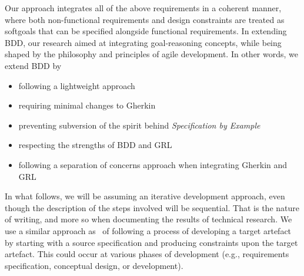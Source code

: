 \documentclass[dissertation,final]{softeng}
\begin{document}
\begin{table}[h!]
\caption[Three types of Requirements]{Three types of requirements~\citep{Leffingwell2011}}
\label{tb:three_req_types}
\setlength{\extrarowheight}{1.8pt}
\centering
{}
\end{table}

Our approach integrates all of the above requirements in a coherent manner, where both non-functional requirements and design constraints are treated as softgoals that can be specified alongside functional requirements. In extending BDD, our research aimed at integrating goal-reasoning concepts, while being shaped by the philosophy and principles of agile development. In other words, we extend BDD by 

\begin{itemize}
\item following a lightweight approach
\item requiring minimal changes to Gherkin
\item preventing subversion of the spirit behind \emph{Specification by Example}
\item respecting the strengths of BDD and GRL
\item following a separation of concerns approach when integrating Gherkin and GRL
\end{itemize}

In what follows, we will be assuming an iterative development approach, even though the description of the steps involved will be sequential. That is the nature of writing, and more so when documenting the results of technical research. We use a similar approach as~\citet{Chung2000} of following a process of developing a target artefact by starting with a source specification and producing constraints upon the target artefact. This could occur at various phases of development (e.g., requirements specification, conceptual design, or development).
\end{document}
